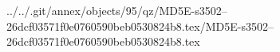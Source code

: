 ../../.git/annex/objects/95/qz/MD5E-s3502--26dcf03571f0e0760590beb0530824b8.tex/MD5E-s3502--26dcf03571f0e0760590beb0530824b8.tex